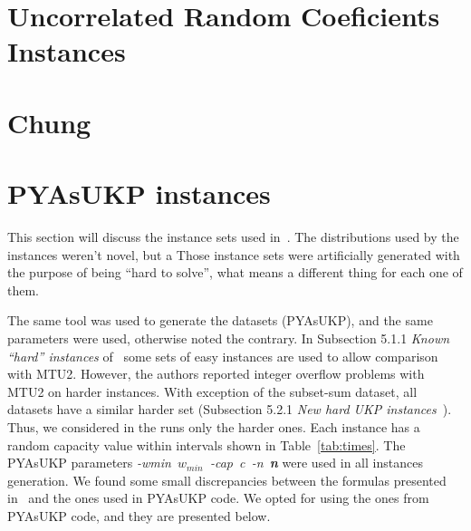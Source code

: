 \section{Uncorrelated Random Coeficients Instances}

\section{Chung}

\section{PYAsUKP instances}

This section will discuss the instance sets used in~\cite{pya}.
The distributions used by the instances weren't novel, but a 
Those instance sets were artificially generated with the purpose of being ``hard to solve'', what means a different thing for each one of them.


The same tool was used to generate the datasets (PYAsUKP), and the same parameters were used, otherwise noted the contrary. 
In Subsection 5.1.1 \emph{Known ``hard'' instances} of~\cite{pya} some sets of easy instances are used to allow comparison with MTU2. 
However, the authors reported integer overflow problems with MTU2 on harder instances. 
With exception of the subset-sum dataset, all datasets have a similar harder set (Subsection 5.2.1 \emph{New hard UKP instances}~\cite{pya}).
Thus, we considered in the runs only the harder ones. 
Each instance has a random capacity value within intervals shown in Table~\ref{tab:times}. 
The PYAsUKP parameters \mbox{\emph{-wmin \(w_{min}\) -cap c -n \textbf{n}}} were used in all instances generation. 
We found some small discrepancies between the formulas presented in~\cite{pya} and the ones used in PYAsUKP code.
We opted for using the ones from  PYAsUKP code, and they are presented below.

